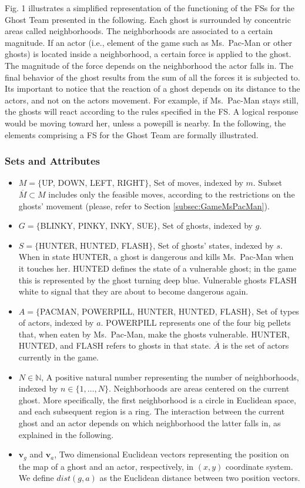\documentclass[journal]{IEEEtran}
\begin{document}
Fig. 1 illustrates a simplified representation of the functioning of the FSs for the Ghost Team presented in the following. Each ghost is surrounded by concentric areas called neighborhoods. The neighborhoods are associated to a certain magnitude. If an actor (i.e., element of the game such as Ms.\ Pac-Man or other ghosts) is located inside a neighborhood, a certain force is applied to the ghost. The magnitude of the force depends on the neighborhood the actor falls in. The final behavior of the ghost results from the sum of all the forces it is subjected to. Its important to notice that the reaction of a ghost depends on its distance to the actors, and not on the actors movement. For example, if Ms.\ Pac-Man stays still, the ghosts will react according to the rules specified in the FS. A logical response would be moving toward her, unless a powepill is nearby. In the following, the elements comprising a FS for the Ghost Team are formally illustrated.

\subsubsection{Sets and Attributes}
\begin{itemize}
  \item $M=\{$UP, DOWN, LEFT, RIGHT$\}$, Set of moves, indexed by $m$. Subset $\overline{M}\subset M$ includes only the feasible moves, according to the restrictions on the ghosts' movement (please, refer to Section \ref{subsec:GameMsPacMan}).
  \item $G=\{$BLINKY, PINKY, INKY, SUE$\}$, Set of ghosts, indexed by $g$.
  \item $S=\{$HUNTER, HUNTED, FLASH$\}$, Set of ghosts' states, indexed by $s$. When in state HUNTER, a ghost is dangerous and kills Ms.\  Pac-Man when it touches her. HUNTED defines the state of a vulnerable ghost; in the game this is represented by the ghost turning deep blue. Vulnerable ghosts FLASH white to signal that they are about to become dangerous again.
  \item $A=\{$PACMAN, POWERPILL, HUNTER, HUNTED, FLASH$\}$, Set of types of actors, indexed by $a$. POWERPILL represents one of the four big pellets that, when eaten by Ms.\  Pac-Man, make the ghosts vulnerable. HUNTER, HUNTED, and FLASH refers to ghosts in that state. $\overline{A}$ is the set of actors currently in the game.
  \item $N \in \mathbb{N}$, A positive natural number representing the number of neighborhoods, indexed by $n  \in \{1, \ldots, N\}$. Neighborhoods are areas centered on the current ghost. More specifically, the first neighborhood is a circle in Euclidean space, and each subsequent region is a ring. The interaction between the current ghost and an actor depends on which neighborhood the latter falls in, as explained in the following.
  \item $\mathbf{v}_g$ and $\mathbf{v}_a$, Two dimensional Euclidean vectors representing the position on the map of a ghost and an actor, respectively, in $(x,y)$ coordinate system. We define $dist(g,a)$ as the Euclidean distance between two position vectors.
\end{itemize}
\end{document}
